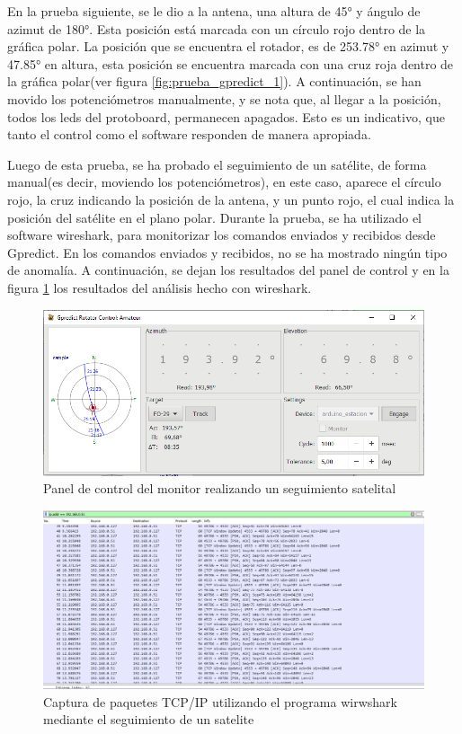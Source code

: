 En la prueba siguiente, se le dio a la antena, una altura de 45° y ángulo de azimut de 180°. Esta posición está marcada con un círculo rojo dentro de la gráfica polar. La posición que se encuentra el rotador, es de 253.78° en azimut y 47.85° en altura, esta posición se encuentra marcada con una cruz roja dentro de la gráfica polar(ver figura \ref{fig:prueba_gpredict_1}). A continuación, se han movido los potenciómetros manualmente,  y se nota que, al llegar a la posición, todos los leds del protoboard, permanecen apagados. Esto es un indicativo, que tanto el control como el software responden de manera apropiada. 

 
Luego de esta prueba, se ha probado el seguimiento de un satélite, de forma manual(es decir, moviendo los potenciómetros), en este caso, aparece el círculo rojo, la cruz indicando la posición de la antena, y un punto rojo, el cual indica la posición del satélite en el plano polar. Durante la prueba, se ha utilizado el software wireshark, para monitorizar los comandos enviados y recibidos desde Gpredict. En los comandos enviados y recibidos, no se ha mostrado ningún tipo de anomalía. A continuación, se dejan los resultados del panel de control y en la figura \ref{fig:wireshark_gpr} los resultados del análisis hecho con wireshark. 


\begin{figure}[ht]
	\centering
	\includegraphics[scale=0.5]{gpredict_seguimiento_sat} 
	\caption{Panel de control del monitor realizando un seguimiento satelital} 
	
\end{figure}

\begin{figure}[ht]
	\includegraphics[scale=0.5]{wireshark_gpredict} 
	\caption{Captura de paquetes TCP/IP utilizando el programa wirwshark mediante el seguimiento de un satelite} 
	\label{fig:wireshark_gpr}
\end{figure}



